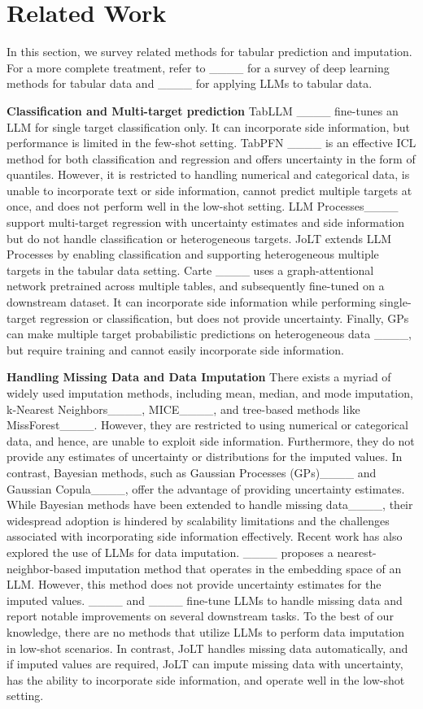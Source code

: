 \section{Related Work}
%
In this section, we survey related methods for tabular prediction and imputation.
%
For a more complete treatment, refer to ____ for a survey of deep learning methods for tabular data and ____ for applying LLMs to tabular data.

\textbf{Classification and Multi-target prediction}
%
TabLLM ____ fine-tunes an LLM for single target classification only.
%
It can incorporate side information, but performance is limited in the few-shot setting.
%
TabPFN ____ is an effective ICL method for both classification and regression and offers uncertainty in the form of quantiles.
%
However, it is restricted to handling numerical and categorical data, is unable to incorporate text or side information, cannot predict multiple targets at once, and does not perform well in the low-shot setting.
%
LLM Processes____ support multi-target regression with uncertainty estimates and side information but do not handle classification or heterogeneous targets.
%
JoLT extends LLM Processes by enabling classification and supporting heterogeneous multiple targets in the tabular data setting.
%
Carte ____ uses a graph-attentional network pretrained across multiple tables, and subsequently fine-tuned on a downstream dataset.
%
It can incorporate side information while performing single-target regression or classification, but does not provide uncertainty.
%
Finally, GPs can make multiple target probabilistic predictions on heterogeneous data ____, but require training and cannot easily incorporate side information.

\textbf{Handling Missing Data and Data Imputation}
%
There exists a myriad of widely used imputation methods, including mean, median, and mode imputation, k-Nearest Neighbors____, MICE____, and tree-based methods like MissForest____.
%
However, they are restricted to using numerical or categorical data, and hence, are unable to exploit side information. Furthermore, they do not provide any estimates of uncertainty or distributions for the imputed values. 
%
In contrast, Bayesian methods, such as Gaussian Processes (GPs)____ and Gaussian Copula____, offer the advantage of providing uncertainty estimates. 
%
While Bayesian methods have been extended to handle missing data____, their widespread adoption is hindered by scalability limitations and the challenges associated with incorporating side information effectively.
%
Recent work has also explored the use of LLMs for data imputation.
%
____ proposes a nearest-neighbor-based imputation method that operates in the embedding space of an LLM.
%
However, this method does not provide uncertainty estimates for the imputed values. 
%
____ and ____ fine-tune LLMs to handle missing data and report notable improvements on several downstream tasks. 
% 
To the best of our knowledge, there are no methods that utilize LLMs to perform data imputation in low-shot scenarios.
%
In contrast, JoLT handles missing data automatically, and if imputed values are required, JoLT can impute missing data with uncertainty, has the ability to incorporate side information, and operate well in the low-shot setting.
%
